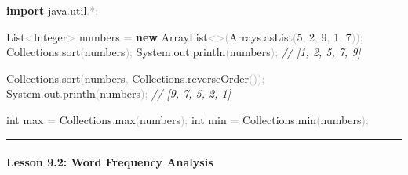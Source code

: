 \documentclass[
  justified,
  openright,
]{tufte-book}
\let\subsection\paragraph
\let\paragraph\paragraph
\newcommand{\KeywordTok}[1]{\textcolor{CodeKeyword}{\textbf{#1}}}  %
\newcommand{\CommentTok}[1]{\textcolor{CodeComment}{\textit{#1}}}  %
\newcommand{\CodeNumTok}[1]{\textcolor{CodeNumber}{#1}}             %
\newcommand{\CodeFuncTok}[1]{\textcolor{CodeKeyword}{#1}}           %
\newcommand{\CodeTypeTok}[1]{\textcolor{CodeType}{#1}}              %
\newcommand{\CodeAccentTok}[1]{\textcolor{CodeAccent}{#1}}          %
\newcommand{\OperatorTok}[1]{\textcolor{DarkGray}{#1}}              %
\newenvironment{Shaded}{%
  \begin{mdframed}[style=TufteCode]%
}{%
  \end{mdframed}%
}
\let\subsection\paragraph
\let\paragraph\paragraph
\begin{document}
\begin{Shaded}
\begin{Highlighting}[]
\KeywordTok{import} \CodeAccentTok{java}\OperatorTok{.}\CodeAccentTok{util}\OperatorTok{.*;}
 
List\OperatorTok{\textless{}}Integer\OperatorTok{\textgreater{}} numbers \OperatorTok{=} \KeywordTok{new} ArrayList\OperatorTok{\textless{}\textgreater{}(}Arrays\OperatorTok{.}\CodeFuncTok{asList}\OperatorTok{(}\CodeNumTok{5}\OperatorTok{,} \CodeNumTok{2}\OperatorTok{,} \CodeNumTok{9}\OperatorTok{,} \CodeNumTok{1}\OperatorTok{,} \CodeNumTok{7}\OperatorTok{));}
Collections\OperatorTok{.}\CodeFuncTok{sort}\OperatorTok{(}numbers\OperatorTok{);}
System\OperatorTok{.}\CodeFuncTok{out}\OperatorTok{.}\CodeFuncTok{println}\OperatorTok{(}numbers\OperatorTok{);}   \CommentTok{// [1, 2, 5, 7, 9]}
 
Collections\OperatorTok{.}\CodeFuncTok{sort}\OperatorTok{(}numbers\OperatorTok{,} Collections\OperatorTok{.}\CodeFuncTok{reverseOrder}\OperatorTok{());}
System\OperatorTok{.}\CodeFuncTok{out}\OperatorTok{.}\CodeFuncTok{println}\OperatorTok{(}numbers\OperatorTok{);}   \CommentTok{// [9, 7, 5, 2, 1]}
 
\CodeTypeTok{int} max \OperatorTok{=} Collections\OperatorTok{.}\CodeFuncTok{max}\OperatorTok{(}numbers\OperatorTok{);}
\CodeTypeTok{int} min \OperatorTok{=} Collections\OperatorTok{.}\CodeFuncTok{min}\OperatorTok{(}numbers\OperatorTok{);}
\end{Highlighting}
\end{Shaded}

\begin{center}\rule{0.5\linewidth}{0.5pt}\end{center}

\subsection{Lesson 9.2: Word Frequency
Analysis}\label{lesson-9.2-word-frequency-analysis}
\end{document}
